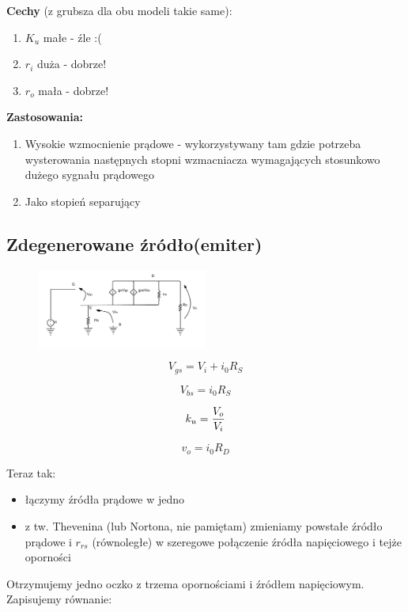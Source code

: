 \documentclass[10pt,a4paper]{article}
\begin{document}
\textbf{Cechy} (z grubsza dla obu modeli takie same):
\begin{enumerate}
	\item \textbf{$K_u$} małe - źle :(
	\item \textbf{$r_i$} duża - dobrze!
	\item \textbf{$r_o$} mała - dobrze!
\end{enumerate}
\textbf{Zastosowania:}
\begin{enumerate}
	\item Wysokie wzmocnienie prądowe - wykorzystywany tam gdzie potrzeba wysterowania następnych stopni wzmacniacza wymagających stosunkowo dużego sygnału prądowego
	\item Jako stopień separujący
\end{enumerate}


\subsection{Zdegenerowane źródło(emiter)}


\begin{figure}[H]
\centering
\includegraphics[width=0.5\textwidth]{DS.png}
\end{figure}

\begin{equation}
V_{gs} = V_i + i_0R_S 
\end{equation}

\begin{equation}
V_{bs} = i_0R_S
\end{equation}

\begin{equation}
k_u = {V_o \over V_i}
\end{equation}

\begin{equation}
v_o = i_0R_D
\end{equation}

Teraz tak:
\begin{itemize}
\item łączymy źródła prądowe w jedno
\item z tw. Thevenina (lub Nortona, nie pamiętam) zmieniamy powstałe źródło prądowe i $r_{rs}$ (równoległe) w szeregowe połączenie źródła napięciowego i tejże oporności
\end{itemize}
Otrzymujemy jedno oczko z trzema opornościami i źródłem napięciowym. Zapisujemy równanie:
\end{document}
